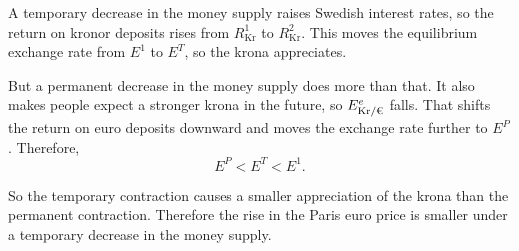 \documentclass[11pt]{article}
\newenvironment{problem}[2][Problem]{\begin{trivlist}
\item[\hskip \labelsep {\bfseries #1}\hskip \labelsep {\bfseries #2.}]
\leavevmode\par
}{\end{trivlist}}
\newcommand{\Ekre}{E^e_{\text{Kr}/\text{\texteuro}}}
\begin{document}
\begin{problem}{1}
\begin{enumerate}[(a)]
\begin{center}
\end{center}

A temporary decrease in the money supply raises Swedish interest rates, so the return on kronor deposits rises from \(R^1_{\text{Kr}}\) to \(R^2_{\text{Kr}}\). This moves the equilibrium exchange rate from \(E^1\) to \(E^T\), so the krona appreciates.

But a permanent decrease in the money supply does more than that. It also makes people expect a stronger krona in the future, so \(\Ekre\) falls. That shifts the return on euro deposits downward and moves the exchange rate further to \(E^P\). Therefore,
\[
E^P < E^T < E^1.
\]

So the temporary contraction causes a smaller appreciation of the krona than the permanent contraction. Therefore the rise in the Paris euro price is smaller under a temporary decrease in the money supply.

\end{enumerate}

\end{problem}
\end{document}
